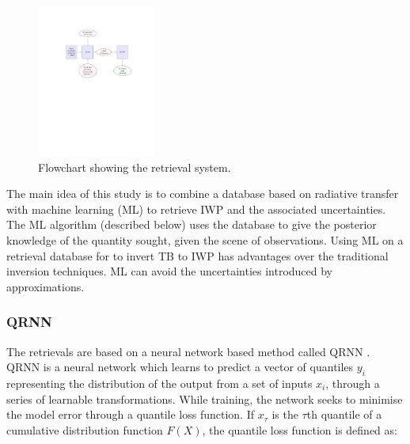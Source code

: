 \documentclass[amt, manuscript]{copernicus}
\begin{document}
\begin{figure}[t]
	\includegraphics[trim=100 410 100 125,clip,height = 50mm, ]{Figures/flowchart.pdf}
	\caption{Flowchart showing the retrieval system.}
	\label{fig:flowchart}
\end{figure}

The main idea of this study is to combine a database based on radiative transfer with machine learning (ML) to retrieve IWP and the associated uncertainties. The ML algorithm (described below) uses the database to give the posterior knowledge of the quantity sought, given the scene of observations. Using ML on a retrieval database for to invert TB to IWP has advantages over the traditional inversion techniques. ML can avoid the uncertainties introduced by approximations. 

\subsubsection{QRNN}
\label{sec:QRNN}

The retrievals are based on a neural network based method called QRNN \citep{pfreundschuh:aneur:18}. QRNN is a neural network which learns to predict a vector of quantiles {$y_i$} representing the distribution of the output from a set of inputs {$x_i$}, through a series of learnable transformations. While training, the network seeks to minimise the model error through a quantile loss function. If $x_{\tau}$ is the $\tau$th quantile of a cumulative distribution function $F(X)$, the quantile loss function is defined as:

\end{document}
